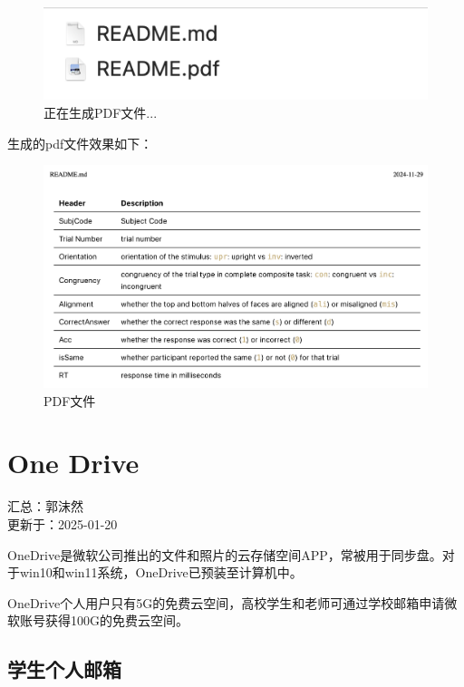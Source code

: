 \documentclass[]{ctexbook}
\theoremstyle{definition}
\theoremstyle{definition}
\theoremstyle{definition}
\theoremstyle{definition}
\theoremstyle{remark}
\begin{document}
\begin{figure}

{\centering \includegraphics[width=0.6\linewidth]{img/vscode/mkreadme_mkpdf} 

}

\caption{正在生成PDF文件...}\label{fig:mkreadme-mkpdf}
\end{figure}

生成的pdf文件效果如下：

\begin{figure}

{\centering \includegraphics[width=1\linewidth]{img/vscode/mkreadme_pdf} 

}

\caption{PDF文件}\label{fig:mkreadme-pdf}
\end{figure}

\chapter{One Drive}\label{onedrive}

汇总：郭沫然\\
更新于：2025-01-20

OneDrive是微软公司推出的文件和照片的云存储空间APP，常被用于同步盘。对于win10和win11系统，OneDrive已预装至计算机中。

OneDrive个人用户只有5G的免费云空间，高校学生和老师可通过学校邮箱申请微软账号获得100G的免费云空间。

\section{学生个人邮箱}\label{ux5b66ux751fux4e2aux4ebaux90aeux7bb1}
\end{document}
